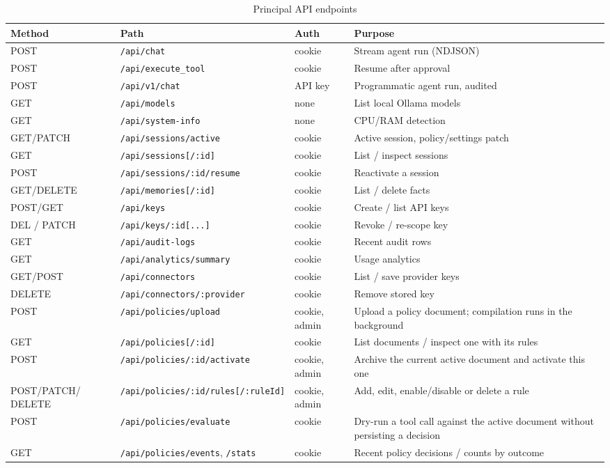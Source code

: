 \documentclass[12pt,a4paper,oneside]{report}
\begin{document}
\begin{table}[h]
\caption{Principal API endpoints}
\centering
\begin{singlespace}
\footnotesize
\begin{tabular}{p{2.1cm}p{5.2cm}p{1.5cm}p{4.2cm}}
\toprule
\textbf{Method} & \textbf{Path} & \textbf{Auth} & \textbf{Purpose} \\
\midrule
POST & \texttt{/api/chat} & cookie & Stream agent run (NDJSON) \\
POST & \texttt{/api/execute\_tool} & cookie & Resume after approval \\
POST & \texttt{/api/v1/chat} & API key & Programmatic agent run,
audited \\
GET & \texttt{/api/models} & none & List local Ollama models \\
GET & \texttt{/api/system-info} & none & CPU/RAM detection \\
GET/PATCH & \texttt{/api/sessions/active} & cookie & Active session,
policy/settings patch \\
GET & \texttt{/api/sessions[/:id]} & cookie & List / inspect
sessions \\
POST & \texttt{/api/sessions/:id/resume} & cookie & Reactivate a
session \\
GET/DELETE & \texttt{/api/memories[/:id]} & cookie & List / delete
facts \\
POST/GET & \texttt{/api/keys} & cookie & Create / list API keys \\
DEL / PATCH & \texttt{/api/keys/:id[...]} & cookie & Revoke /
re-scope key \\
GET & \texttt{/api/audit-logs} & cookie & Recent audit rows \\
GET & \texttt{/api/analytics/summary} & cookie & Usage analytics \\
GET/POST & \texttt{/api/connectors} & cookie & List / save provider
keys \\
DELETE & \texttt{/api/connectors/:provider} & cookie & Remove stored
key \\
POST & \texttt{/api/policies/upload} & cookie, admin & Upload a policy
document; compilation runs in the background \\
GET & \texttt{/api/policies[/:id]} & cookie & List documents / inspect
one with its rules \\
POST & \texttt{/api/policies/:id/activate} & cookie, admin & Archive
the current active document and activate this one \\
POST/PATCH/ DELETE & \texttt{/api/policies/:id/rules[/:ruleId]} &
cookie, admin & Add, edit, enable/disable or delete a rule \\
POST & \texttt{/api/policies/evaluate} & cookie & Dry-run a tool call
against the active document without persisting a decision \\
GET & \texttt{/api/policies/events}, \texttt{/stats} & cookie & Recent
policy decisions / counts by outcome \\
\bottomrule
\end{tabular}
\end{singlespace}
\end{table}
\end{document}
